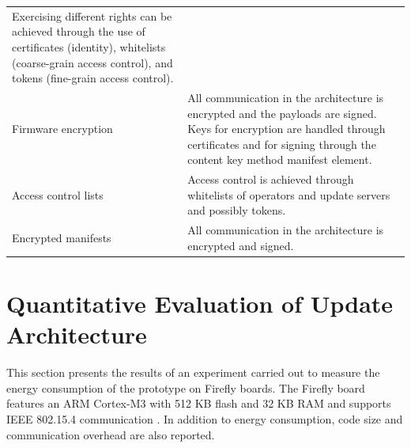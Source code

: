 \documentclass[0-thesis.tex]{subfiles}
\begin{document}
\begin{small}
\begin{longtable}[]{@{}ll@{}}
\begin{minipage}[t]{0.57\columnwidth}
    Exercising different rights can be achieved through the use of
    certificates (identity), whitelists (coarse-grain access control), and
    tokens (fine-grain access control).\strut
    \end{minipage}\tabularnewline
    \begin{minipage}[t]{0.37\columnwidth}\raggedright\strut
    Firmware encryption\strut
    \end{minipage} & \begin{minipage}[t]{0.57\columnwidth}\raggedright\strut
    All communication in the architecture is encrypted and the payloads are
    signed. Keys for encryption are handled through certificates and for
    signing through the content key method manifest element.\strut
    \end{minipage}\tabularnewline
    \begin{minipage}[t]{0.37\columnwidth}\raggedright\strut
    Access control lists\strut
    \end{minipage} & \begin{minipage}[t]{0.57\columnwidth}\raggedright\strut
    Access control is achieved through whitelists of operators and update
    servers and possibly tokens.\strut
    \end{minipage}\tabularnewline
    \begin{minipage}[t]{0.37\columnwidth}\raggedright\strut
    Encrypted manifests\strut
    \end{minipage} & \begin{minipage}[t]{0.57\columnwidth}\raggedright\strut
    All communication in the architecture is encrypted and signed.\strut
    \end{minipage}\tabularnewline
    \bottomrule
\end{longtable}
\end{small}

\section{Quantitative Evaluation of Update Architecture}
\label{sec:quant-evaluation}
This section presents the results of an experiment carried out to measure the energy
consumption of the prototype on Firefly boards. The Firefly board features an ARM
Cortex-M3 with 512 KB flash and 32 KB RAM and supports IEEE 802.15.4 communication
\parencite{firefly-datasheet}. In addition to energy consumption, code size and
communication overhead are also reported. 
\end{document}
